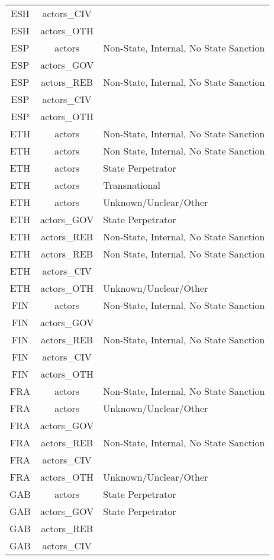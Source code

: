 \documentclass[12pt]{article}
\begin{document}
\begin{center}
\begin{longtable}{|c|c|p{10cm}|}
  ESH & actors\_CIV &  \\ 
  ESH & actors\_OTH &  \\ 
  ESP & actors & Non-State, Internal, No State Sanction \\ 
  ESP & actors\_GOV &  \\ 
  ESP & actors\_REB & Non-State, Internal, No State Sanction \\ 
  ESP & actors\_CIV &  \\ 
  ESP & actors\_OTH &  \\ 
  ETH & actors & Non-State, Internal, No State Sanction \\ 
  ETH & actors & Non State, Internal, No State Sanction \\ 
  ETH & actors & State Perpetrator \\ 
  ETH & actors & Transnational \\ 
  ETH & actors & Unknown/Unclear/Other \\ 
  ETH & actors\_GOV & State Perpetrator \\ 
  ETH & actors\_REB & Non-State, Internal, No State Sanction \\ 
  ETH & actors\_REB & Non State, Internal, No State Sanction \\ 
  ETH & actors\_CIV &  \\ 
  ETH & actors\_OTH & Unknown/Unclear/Other \\ 
  FIN & actors & Non-State, Internal, No State Sanction \\ 
  FIN & actors\_GOV &  \\ 
  FIN & actors\_REB & Non-State, Internal, No State Sanction \\ 
  FIN & actors\_CIV &  \\ 
  FIN & actors\_OTH &  \\ 
  FRA & actors & Non-State, Internal, No State Sanction \\ 
  FRA & actors & Unknown/Unclear/Other \\ 
  FRA & actors\_GOV &  \\ 
  FRA & actors\_REB & Non-State, Internal, No State Sanction \\ 
  FRA & actors\_CIV &  \\ 
  FRA & actors\_OTH & Unknown/Unclear/Other \\ 
  GAB & actors & State Perpetrator \\ 
  GAB & actors\_GOV & State Perpetrator \\ 
  GAB & actors\_REB &  \\ 
  GAB & actors\_CIV &  \\ 

\end{longtable}
\end{center}
\end{document}
